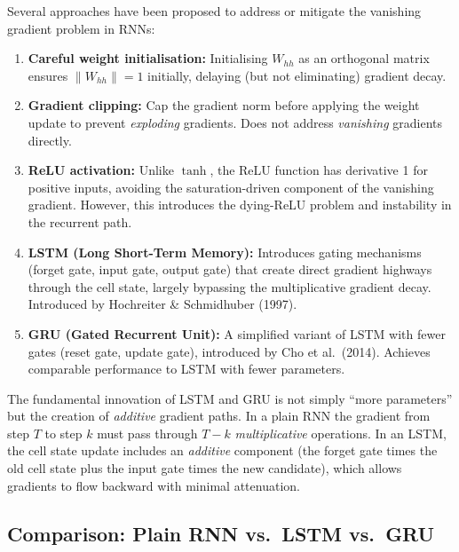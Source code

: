 \documentclass[12pt,a4paper]{article}
\newcommand{\Whh}{W_{hh}}
\begin{document}
Several approaches have been proposed to address or mitigate the vanishing
gradient problem in RNNs:

\begin{enumerate}[label=\arabic*.]
  \item \textbf{Careful weight initialisation:} Initialising $\Whh$ as an
        orthogonal matrix ensures $\|\Whh\| = 1$ initially, delaying (but not
        eliminating) gradient decay.
  \item \textbf{Gradient clipping:} Cap the gradient norm before applying the
        weight update to prevent \emph{exploding} gradients.  Does not address
        \emph{vanishing} gradients directly.
  \item \textbf{ReLU activation:} Unlike $\tanh$, the ReLU function has
        derivative 1 for positive inputs, avoiding the saturation-driven
        component of the vanishing gradient.  However, this introduces the
        dying-ReLU problem and instability in the recurrent path.
  \item \textbf{LSTM (Long Short-Term Memory):} Introduces gating mechanisms
        (forget gate, input gate, output gate) that create direct gradient
        highways through the cell state, largely bypassing the multiplicative
        gradient decay.  Introduced by Hochreiter \& Schmidhuber (1997).
  \item \textbf{GRU (Gated Recurrent Unit):} A simplified variant of LSTM with
        fewer gates (reset gate, update gate), introduced by Cho et al.\ (2014).
        Achieves comparable performance to LSTM with fewer parameters.
\end{enumerate}

\begin{keyinsight}[title=LSTM and GRU as Gradient Highways]
The fundamental innovation of LSTM and GRU is not simply ``more parameters'' but
the creation of \emph{additive} gradient paths.  In a plain RNN the gradient
from step $T$ to step $k$ must pass through $T-k$ \emph{multiplicative}
operations.  In an LSTM, the cell state update includes an \emph{additive}
component (the forget gate times the old cell state plus the input gate times
the new candidate), which allows gradients to flow backward with minimal
attenuation.
\end{keyinsight}

\subsection{Comparison: Plain RNN vs.\ LSTM vs.\ GRU}
\label{subsec:rnn_lstm_gru_compare}
\end{document}

